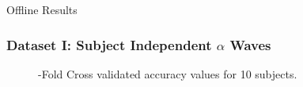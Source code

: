 \documentclass[aspectratio=169]{beamer}
\begin{document}
    
    \begin{frame}
        \begin{center}
            \LARGE Offline Results   
        \end{center}
    \end{frame}
    
    \begin{frame}
        \frametitle{Dataset I: Subject Independent $\alpha $ Waves }        
   \begin{figure}[thpb]
      \centering
      \setlength\fboxsep{0pt}
	  \setlength\fboxrule{0.5pt}
      \caption{-Fold Cross validated accuracy values for 10 subjects.}
      \label{figure2}
   \end{figure}   
    \end{frame}
    
\end{document}
